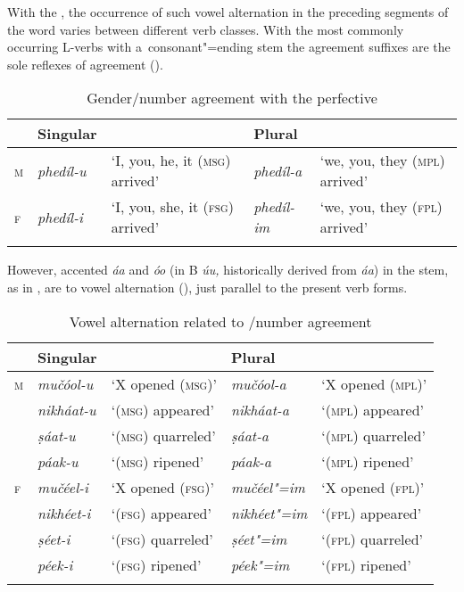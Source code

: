 With the , the occurrence of such vowel alternation in the preceding segments of the word varies between different verb classes. With the most commonly occurring L-verbs with a~consonant"=ending stem the agreement suffixes are the sole reflexes of agreement ().


\begin{table}[ht]
\caption{Gender/number agreement with the perfective}

\begin{tabularx}{\textwidth}{ l l Q l Q }
\lsptoprule
&
Singular &
&
Plural &
\\\midrule
\textsc{m} &
\textit{phedíl-u} &
`I, you, he, it (\textsc{msg}) arrived' &
\textit{phedíl-a} &
`we, you, they (\textsc{mpl}) arrived'\\
\textsc{f} &
\textit{phedíl-i} &
`I, you, she, it (\textsc{fsg}) arrived' &
\textit{phedíl-im} &
`we, you, they (\textsc{fpl}) arrived'\\\lspbottomrule
\end{tabularx}
\label{tab:8-19}
\end{table}


However, accented \textit{áa} and \textit{óo} (in B \textit{úu,} historically derived from \textit{áa}) in the  stem, as in , are  to vowel alternation (), just parallel to the present verb forms. 


\begin{table}
\caption{Vowel alternation related to /number agreement}

\begin{tabularx}{\textwidth}{ l l@{\hspace{20pt}} l@{\hspace{20pt}} l@{\hspace{20pt}} l@{\hspace{20pt}} }
\lsptoprule
&
Singular &
&
Plural &
\\\midrule
\textsc{m} &
\textit{mučóol-u} &
`X opened (\textsc{msg})' &
\textit{mučóol-a} &
`X opened (\textsc{mpl})'\\
&
\textit{nikháat-u} &
`(\textsc{msg}) appeared' &
\textit{nikháat-a} &
`(\textsc{mpl}) appeared'\\
&
\textit{ṣáat-u} &
`(\textsc{msg}) quarreled' &
\textit{ṣáat-a} &
`(\textsc{mpl}) quarreled'\\
&
\textit{páak-u} &
`(\textsc{msg}) ripened' &
\textit{páak-a} &
`(\textsc{mpl}) ripened'\\
\textsc{f} &
\textit{mučéel-i} &
`X opened (\textsc{fsg})' &
\textit{mučéel"=im} &
`X opened (\textsc{fpl})'\\
&
\textit{nikhéet-i} &
`(\textsc{fsg}) appeared' &
\textit{nikhéet"=im} &
`(\textsc{fpl}) appeared'\\
&
\textit{ṣéet-i} &
`(\textsc{fsg}) quarreled' &
\textit{ṣéet"=im} &
`(\textsc{fpl}) quarreled'\\
&
\textit{péek-i} &
`(\textsc{fsg}) ripened' &
\textit{péek"=im} &
`(\textsc{fpl}) ripened'\\\lspbottomrule
\end{tabularx}
\label{tab:8-20}
\end{table}


